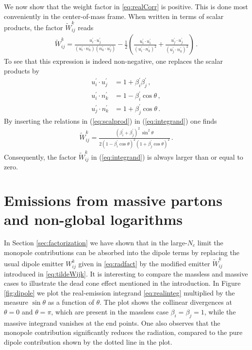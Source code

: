 \documentclass[11pt,a4paper]{article}
\begin{document}
We now show that the weight factor in \eqref{eq:realCorr} is positive. This is done most conveniently in the center-of-mass frame. When written in  terms of scalar products, the factor $\widetilde{W}_{ij}^k$ reads
\begin{align}
\widetilde{W}_{ij}^k =\frac{u_i^\prime \cdot u_{j}^\prime}{(u_i^\prime \cdot n_k^\prime) (n_k^\prime \cdot u_j^\prime)}-\frac{1}{2}\left(\frac{u_i^\prime \cdot u_{i}^\prime}{(u_i^\prime \cdot n_k^\prime)^2}+\frac{u_j^\prime \cdot u_{j}^\prime}{(u_j^\prime \cdot n_k^\prime)^2}\right)\,.
\label{eq:integrand}
\end{align}
To see that this expression is indeed non-negative, one replaces the scalar products by 
\begin{align}
u^\prime_i \cdot u^\prime_{j}&= 1+\beta^\prime_i \beta^\prime_j \, , \nonumber \\
u^\prime_i \cdot n^\prime_{k}&=1-\beta^\prime_i\cos\theta\, , \nonumber \\
u^\prime_j \cdot n^\prime_{k}&=1 + \beta^\prime_j\cos \theta\, . \label{eq:scalprod}
\end{align}
By inserting the relations in (\ref{eq:scalprod}) in (\ref{eq:integrand})
one finds
\begin{align}\label{eq:realinteg}
\widetilde{W}_{ij}^k =
\frac{ (\beta_i^\prime +\beta_j^\prime)^2 \,\sin^2 \theta}{2 (1-\beta^\prime_i \cos \theta)^2 (1+\beta^\prime_j \cos \theta)^2 } \, .
\end{align}
Consequently, the factor $\widetilde{W}_{ij}^k$ in (\ref{eq:integrand}) is always larger than or equal to zero.


\section{Emissions from massive partons and non-global logarithms}\label{sec:massiveeffects}

In Section \ref{sec:factorization} we have shown that in the large-$N_c$ limit the monopole contributions can be absorbed into the dipole terms by replacing the usual dipole emitter $W_{ij}^k$  given in \eqref{eq:radfact} by the modified emitter $\widetilde{W}_{ij}^k$ introduced in \eqref{eq:tildeWijk}. It is interesting to compare the massless and massive cases to illustrate the dead cone effect  \cite{Dokshitzer:1991fc,Dokshitzer:1991fd,Ellis:1991qj,Maltoni:2016ays} mentioned in the introduction. In Figure \ref{fig:dipole} we plot the real-emission integrand \eqref{eq:realinteg} multiplied by the measure $\sin\theta$ as a function of $\theta$. The plot shows the collinear divergences at $\theta=0$ and $\theta=\pi$, which are present in the massless case $\beta_i = \beta_j =1$, while the massive integrand vanishes at the end points. One also observes that the monopole contribution significantly reduces the radiation, compared to the pure dipole contribution shown by the dotted line in the plot.
\end{document}
